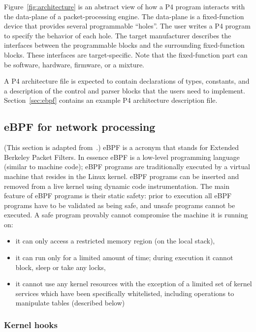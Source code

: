 Figure~\ref{fig:architecture} is an abstract view of how a P4 program
interacts with the data-plane of a packet-processing engine.  The
data-plane is a fixed-function device that provides several
programmable ``holes''.  The user writes a P4 program to specify the
behavior of each hole.  The target manufacturer describes the
interfaces between the programmable blocks and the surrounding
fixed-function blocks.  These interfaces are target-specific.  Note
that the fixed-function part can be software, hardware, firmware, or a
mixture.

A P4 architecture file is expected to contain declarations of types,
constants, and a description of the control and parser blocks that the
users need to implement.  Section~\ref{sec:ebpf} contains an example
P4 architecture description file.

\subsection{eBPF for network processing}

(This section is adapted from~\cite{p4-ebpf-backend}.)  eBPF is a
acronym that stands for Extended Berkeley Packet Filters. In essence
eBPF is a low-level programming language (similar to machine code);
eBPF programs are traditionally executed by a virtual machine that
resides in the Linux kernel. eBPF programs can be inserted and removed
from a live kernel using dynamic code instrumentation. The main
feature of eBPF programs is their static safety: prior to execution
all eBPF programs have to be validated as being safe, and unsafe
programs cannot be executed. A safe program provably cannot compromise
the machine it is running on:
\begin{itemize}
\item it can only access a restricted memory region (on the local
  stack),
\item it can run only for a limited amount of time; during execution
  it cannot block, sleep or take any locks,
\item it cannot use any kernel resources with the exception of a
  limited set of kernel services which have been specifically
  whitelisted, including operations to manipulate tables (described
  below)
\end{itemize}

\subsubsection{Kernel hooks}

